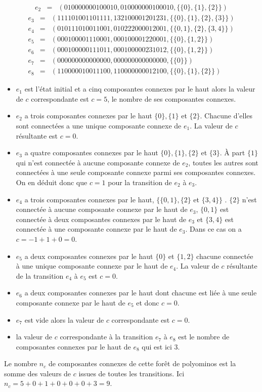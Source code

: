 \begin{Ex}
\begin{eqnarray*}
e_{2} & = & (010000000100010,010000000100010,\{\{0\},\{1\},\{2\}\})
\end{eqnarray*}
\begin{eqnarray*}
e_{3} & = & (111101001101111, 132100001201231,\{\{0\},\{1\},\{2\},\{3\}\})\\
e_{4} & = & (010111010011001,010222000012001,\{\{0,1\},\{2\},\{3,4\}\})\\
e_{5} & = & (000100001110001,000100001220001,\{\{0\},\{1,2\}\})\\
e_{6} & = & (000100000111011,000100000231012,\{\{0\},\{1,2\}\})\\
e_{7} & = & (000000000000000,000000000000000,\{\{0\}\})\\
e_{8} & = & (110000010011100,110000000012100,\{\{0\},\{1\},\{2\}\})
\end{eqnarray*}
\begin{itemize}
\item $e_{1}$ est l'état initial et a cinq composantes connexes par le haut  alors la valeur de $c$ correspondante est $c=5$, le nombre de ses composantes connexes.
\item $e_{2}$ a trois composantes connexes par le haut $\{0\},\{1\}$ et $\{2\}$. Chacune d'elles sont connectées a une unique composante connexe de $e_{1}$. La valeur de $c$ résultante est $c=0$.
\item $e_{3}$ a quatre composantes connexes par le haut $\{0\},\{1\},\{2\}$ et $\{3\}$. À part $\{1\}$ qui n'est connectée à aucune composante connexe de $e_{2}$, toutes les autres sont connectées à une seule composante connexe parmi ses composantes connexes. On en déduit donc que $c=1$ pour la transition de $e_{2}$ à $e_{3}$.
\item $e_{4}$ a trois composantes connexes par le haut, $\{\{0,1\},\{2\}$  et $\{3,4\}\}$ . $\{2\}$ n'est connectée à aucune composante connexe par le haut de $e_{3}$, $\{0,1\}$ est connectée à deux composantes connexes par le haut de $e_{3}$ et $\{3,4\}$ est connectée à une composante connexe par le haut de $e_{3}$. Dans ce cas on a $c=-1+1+0=0$.
\item $e_{5}$ a deux composantes connexes par le haut $\{0\}$ et $\{1,2\}$
chacune connectée à une unique composante connexe par le haut de $e_{4}$. La valeur de $c$ résultante de la transition $e_{4}$ à $e_{5}$ est $c=0$.
\item $e_{6}$  a deux composantes connexes par le haut dont chacune est liée à une seule composante connexe par le haut de $e_{5}$ et donc $c=0$.
\item $e_{7}$ est vide alors la valeur de $c$ correspondante est $c=0$.
\item  la valeur de $c$ correspondante à  la transition $e_{7}$ à $e_{8}$ est le nombre de composantes connexes par le haut de $e_{8}$ qui est ici $3$.
\end{itemize}

Le nombre $n_{c}$ de composantes connexes de cette forêt de polyominos est la somme des valeurs de $c$ issues de toutes les transitions. Ici $n_{c}=5+0+1+0+0+0+3=9$.
\end{Ex}

